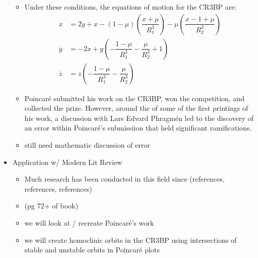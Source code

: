 \documentclass{article}
\begin{document}
\begin{itemize}
\begin{itemize}
\begin{figure}
		\label{fig:CR3BP}
	  	\end{figure}
		\item Under these conditions, the equations of motion for the CR3BP are:
	  	\begin{align}
	  	\ddot{x} &=  2\dot{y} + x - (1-\mu)\left(\dfrac{x+\mu}{R_1^3}\right) - \mu\left(\dfrac{x-1+\mu}{R_2^3}\right)\\
		\ddot{y} &= - 2\dot{x} + y\left(-\dfrac{1-\mu}{R_1^3} - \dfrac{\mu}{R_2^3} + 1\right) \\
		\ddot{z} &= z\left(-\dfrac{1 - \mu}{R_1^3} - \dfrac{\mu}{R_2^3}\right)
		\end{align}
	  	\item Poincaré submitted his work on the CR3BP, won the competition, and collected the prize. However, around the of some of the first printings of his work, a discussion with Lars Edvard Phragmén led to the discovery of an error within Poincaré's submissiion that held significant ramifications.
	  	\item \color{red} still need mathematic discussion of error \color{black}

	  \end{itemize}
	\item Application w/ Modern Lit Review
	  \begin{itemize}
	  	\item \color{red}Much research has been conducted in this field since (references, references, references)\color{black}
	  	\item (pg 72+ of book)
	  	\item we will look at / recreate Poincaré's work
	  	\item we will create homoclinic orbits in the CR3BP using intersections of stable and unstable orbits in Poincaré plots
	  \end{itemize}
\end{itemize}



\end{document}
